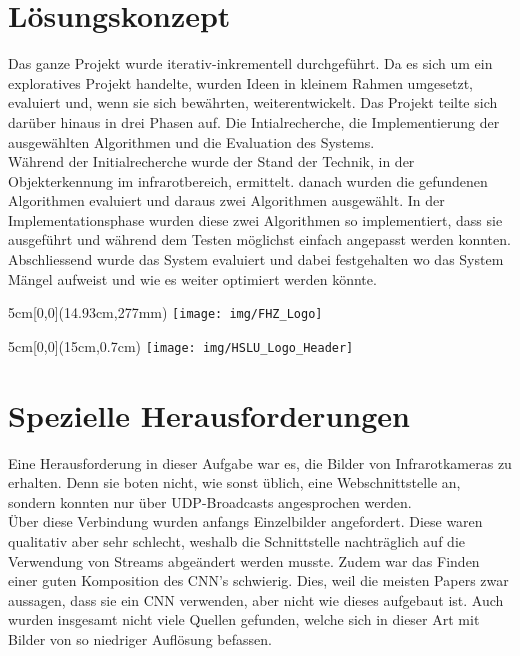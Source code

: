 \documentclass[
	a4paper
]{scrartcl}
\begin{document}
\section{Lösungskonzept}
Das ganze Projekt wurde iterativ-inkrementell durchgeführt. Da es sich um ein exploratives Projekt handelte, wurden Ideen in kleinem Rahmen umgesetzt, evaluiert und, wenn sie sich bewährten, weiterentwickelt. Das Projekt teilte sich darüber hinaus in drei Phasen auf. Die Intialrecherche, die Implementierung der ausgewählten Algorithmen und die Evaluation des Systems.\\
Während der Initialrecherche wurde der Stand der Technik, in der Objekterkennung im infrarotbereich, ermittelt. danach wurden die gefundenen Algorithmen evaluiert und daraus zwei Algorithmen ausgewählt.
In der Implementationsphase wurden diese zwei Algorithmen so implementiert, dass sie ausgeführt und während dem Testen möglichst einfach angepasst werden konnten. 
Abschliessend wurde das System evaluiert und dabei festgehalten wo das System Mängel aufweist und wie es weiter optimiert werden könnte.

\begin{textblock*}{5cm}[0,0](14.93cm,277mm)
	\texttt{[image: img/FHZ\_Logo]}
\end{textblock*}

\newpage

\begin{textblock*}{5cm}[0,0](15cm,0.7cm)
	\texttt{[image: img/HSLU\_Logo\_Header]}
\end{textblock*}


\section{Spezielle Herausforderungen}
Eine Herausforderung in dieser Aufgabe war es, die Bilder von Infrarotkameras zu erhalten. Denn sie boten nicht, wie sonst üblich, eine Webschnittstelle an, sondern konnten nur über UDP-Broadcasts angesprochen werden.\\
Über diese Verbindung wurden anfangs Einzelbilder angefordert. Diese waren qualitativ aber sehr schlecht, weshalb die Schnittstelle nachträglich auf die Verwendung von Streams abgeändert werden musste.
Zudem war das Finden einer guten Komposition des CNN's schwierig. Dies, weil die meisten Papers zwar aussagen, dass sie ein CNN verwenden, aber nicht wie dieses aufgebaut ist. Auch wurden insgesamt nicht viele Quellen gefunden, welche sich in dieser Art mit Bilder von so niedriger Auflösung befassen.
\end{document}
